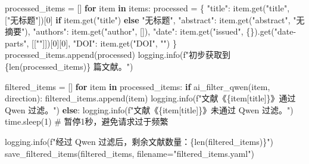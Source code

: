 \documentclass[
  letterpaper,
  DIV=11,
  numbers=noendperiod]{scrreprt}
\newenvironment{Shaded}{\begin{snugshade}}{\end{snugshade}}
\newcommand{\BuiltInTok}[1]{\textcolor[rgb]{0.00,0.23,0.31}{#1}}
\newcommand{\CommentTok}[1]{\textcolor[rgb]{0.37,0.37,0.37}{#1}}
\newcommand{\ControlFlowTok}[1]{\textcolor[rgb]{0.00,0.23,0.31}{\textbf{#1}}}
\newcommand{\DecValTok}[1]{\textcolor[rgb]{0.68,0.00,0.00}{#1}}
\newcommand{\KeywordTok}[1]{\textcolor[rgb]{0.00,0.23,0.31}{\textbf{#1}}}
\newcommand{\NormalTok}[1]{\textcolor[rgb]{0.00,0.23,0.31}{#1}}
\newcommand{\OperatorTok}[1]{\textcolor[rgb]{0.37,0.37,0.37}{#1}}
\newcommand{\SpecialCharTok}[1]{\textcolor[rgb]{0.37,0.37,0.37}{#1}}
\newcommand{\SpecialStringTok}[1]{\textcolor[rgb]{0.13,0.47,0.30}{#1}}
\newcommand{\StringTok}[1]{\textcolor[rgb]{0.13,0.47,0.30}{#1}}
\begin{document}
\begin{Shaded}
\begin{Highlighting}[]
\NormalTok{    processed\_items }\OperatorTok{=}\NormalTok{ []}
    \ControlFlowTok{for}\NormalTok{ item }\KeywordTok{in}\NormalTok{ items:}
\NormalTok{        processed }\OperatorTok{=}\NormalTok{ \{}
            \StringTok{"title"}\NormalTok{: item.get(}\StringTok{"title"}\NormalTok{, [}\StringTok{"无标题"}\NormalTok{])[}\DecValTok{0}\NormalTok{] }\ControlFlowTok{if}\NormalTok{ item.get(}\StringTok{"title"}\NormalTok{) }\ControlFlowTok{else} \StringTok{"无标题"}\NormalTok{,}
            \StringTok{"abstract"}\NormalTok{: item.get(}\StringTok{"abstract"}\NormalTok{, }\StringTok{"无摘要"}\NormalTok{),}
            \StringTok{"authors"}\NormalTok{: item.get(}\StringTok{"author"}\NormalTok{, []),}
            \StringTok{"date"}\NormalTok{: item.get(}\StringTok{"issued"}\NormalTok{, \{\}).get(}\StringTok{"date{-}parts"}\NormalTok{, [[}\StringTok{""}\NormalTok{]])[}\DecValTok{0}\NormalTok{][}\DecValTok{0}\NormalTok{],}
            \StringTok{"DOI"}\NormalTok{: item.get(}\StringTok{"DOI"}\NormalTok{, }\StringTok{""}\NormalTok{)}
\NormalTok{        \}}
\NormalTok{        processed\_items.append(processed)}
\NormalTok{    logging.info(}\SpecialStringTok{f"初步获取到 }\SpecialCharTok{\{}\BuiltInTok{len}\NormalTok{(processed\_items)}\SpecialCharTok{\}}\SpecialStringTok{ 篇文献。"}\NormalTok{)}

\NormalTok{    filtered\_items }\OperatorTok{=}\NormalTok{ []}
    \ControlFlowTok{for}\NormalTok{ item }\KeywordTok{in}\NormalTok{ processed\_items:}
        \ControlFlowTok{if}\NormalTok{ ai\_filter\_qwen(item, direction):}
\NormalTok{            filtered\_items.append(item)}
\NormalTok{            logging.info(}\SpecialStringTok{f"文献《}\SpecialCharTok{\{}\NormalTok{item[}\StringTok{\textquotesingle{}title\textquotesingle{}}\NormalTok{]}\SpecialCharTok{\}}\SpecialStringTok{》通过 Qwen 过滤。"}\NormalTok{)}
        \ControlFlowTok{else}\NormalTok{:}
\NormalTok{            logging.info(}\SpecialStringTok{f"文献《}\SpecialCharTok{\{}\NormalTok{item[}\StringTok{\textquotesingle{}title\textquotesingle{}}\NormalTok{]}\SpecialCharTok{\}}\SpecialStringTok{》未通过 Qwen 过滤。"}\NormalTok{)}
\NormalTok{        time.sleep(}\DecValTok{1}\NormalTok{)  }\CommentTok{\# 暂停1秒，避免请求过于频繁}

\NormalTok{    logging.info(}\SpecialStringTok{f"经过 Qwen 过滤后，剩余文献数量：}\SpecialCharTok{\{}\BuiltInTok{len}\NormalTok{(filtered\_items)}\SpecialCharTok{\}}\SpecialStringTok{"}\NormalTok{)}
\NormalTok{    save\_filtered\_items(filtered\_items, filename}\OperatorTok{=}\StringTok{"filtered\_items.yaml"}\NormalTok{)}


\end{Highlighting}
\end{Shaded}
\end{document}

